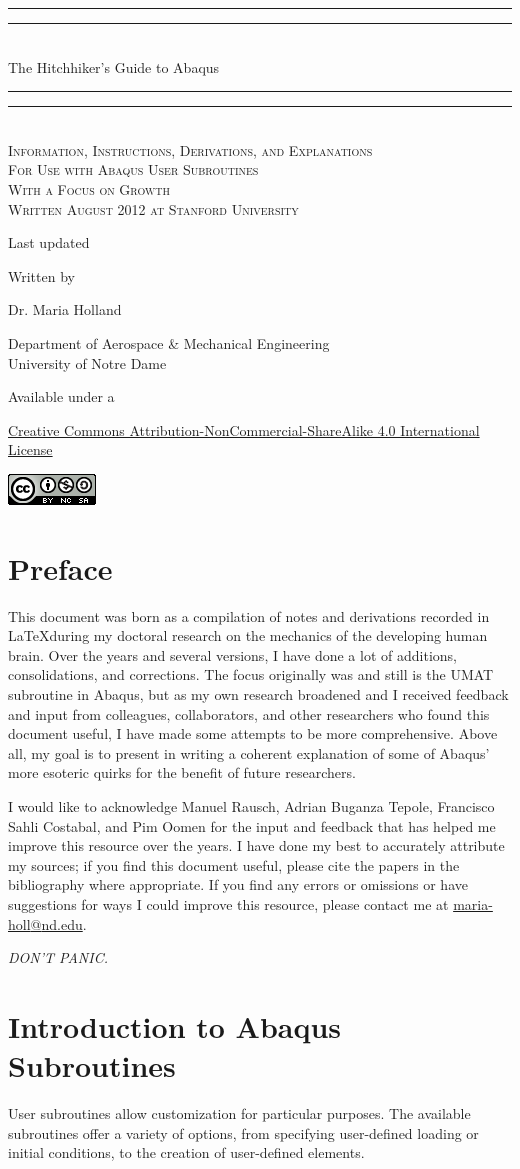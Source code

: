 \documentclass[10pt,letterpaper,oneside]{report}
\newcommand*{\titleGP}{\begingroup 
\thispagestyle{empty}
\centering

\vspace*{8\baselineskip} %
\rule{\textwidth}{1.6pt}\vspace*{-\baselineskip}\vspace*{2pt} 
\rule{\textwidth}{0.4pt}\\[\baselineskip] 
{\LARGE The Hitchhiker's Guide to Abaqus}\\[0.2\baselineskip] 
\rule{\textwidth}{0.4pt}\vspace*{-\baselineskip}\vspace{3.2pt} 
\rule{\textwidth}{1.6pt}\\[\baselineskip] %

\scshape
Information, Instructions, Derivations, and Explanations \\ 
For Use with Abaqus User Subroutines \\ 
With a Focus on Growth \\ [\baselineskip]
Written August 2012 at Stanford University \par  
Last updated \monthname \, \the\year

\vspace*{2\baselineskip} %

Written by \\[\baselineskip]
{\Large Dr. Maria Holland\par}
Department of Aerospace \& Mechanical Engineering \\ 
University of Notre Dame\par
\vspace*{2\baselineskip}
Available under a\par
\href{http://creativecommons.org/licenses/by-nc-sa/4.0/}{
Creative Commons Attribution-NonCommercial-ShareAlike 4.0 International License}

\includegraphics{CC_license.png}

\vfill

\endgroup}
\begin{document}
\titleGP 


\chapter*{Preface}
\thispagestyle{empty}

This document was born as a compilation of notes and derivations recorded in \LaTeX during my doctoral research on the mechanics of the developing human brain.  Over the years and several versions, I have done a lot of additions, consolidations, and corrections.  The focus originally was and still is the UMAT subroutine in Abaqus, but as my own research broadened and I received feedback and input from colleagues, collaborators, and other researchers who found this document useful, I have made some attempts to be more comprehensive.  Above all, my goal is to present in writing a coherent explanation of some of Abaqus' more esoteric quirks for the benefit of future researchers.

I would like to acknowledge Manuel Rausch, Adrian Buganza Tepole, Francisco Sahli Costabal, and Pim Oomen for the input and feedback that has helped me improve this resource over the years.  I have done my best to accurately attribute my sources; if you find this document useful, please cite the papers in the bibliography where appropriate.  If you find any errors or omissions or have suggestions for ways I could improve this resource, please contact me at \href{mailto:maria-holl@nd.edu}{maria-holl{\selectfont @}nd.edu}.

\vspace{0.5in}
\begin{center} 
\large{\emph{DON'T PANIC.}}
\end{center}


\newpage
\setcounter{tocdepth}{1}
\tableofcontents

\restoregeometry


\chapter{Introduction to Abaqus Subroutines}

User subroutines allow customization for particular purposes.  The available subroutines offer a variety of options, from specifying user-defined loading or initial conditions, to the creation of user-defined elements.  
\end{document}
